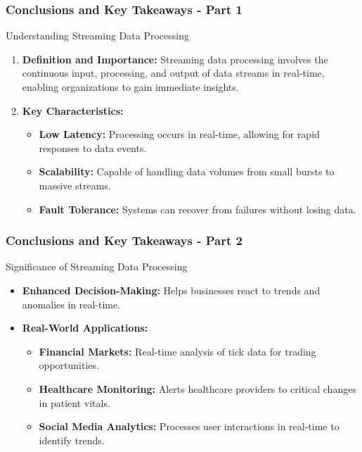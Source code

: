 \documentclass[aspectratio=169]{beamer}
\begin{document}
\begin{frame}[fragile]
    \frametitle{Conclusions and Key Takeaways - Part 1}
    \begin{block}{Understanding Streaming Data Processing}
        \begin{enumerate}
            \item \textbf{Definition and Importance:} 
                Streaming data processing involves the continuous input, processing, and output of data streams in real-time, enabling organizations to gain immediate insights.
            \item \textbf{Key Characteristics:}
                \begin{itemize}
                    \item \textbf{Low Latency:} Processing occurs in real-time, allowing for rapid responses to data events.
                    \item \textbf{Scalability:} Capable of handling data volumes from small bursts to massive streams.
                    \item \textbf{Fault Tolerance:} Systems can recover from failures without losing data.
                \end{itemize}
        \end{enumerate}
    \end{block}
\end{frame}

\begin{frame}[fragile]
    \frametitle{Conclusions and Key Takeaways - Part 2}
    \begin{block}{Significance of Streaming Data Processing}
        \begin{itemize}
            \item \textbf{Enhanced Decision-Making:} Helps businesses react to trends and anomalies in real-time. 
            \item \textbf{Real-World Applications:}
                \begin{itemize}
                    \item \textbf{Financial Markets:} Real-time analysis of tick data for trading opportunities.
                    \item \textbf{Healthcare Monitoring:} Alerts healthcare providers to critical changes in patient vitals.
                    \item \textbf{Social Media Analytics:} Processes user interactions in real-time to identify trends.
                \end{itemize}
        \end{itemize}
    \end{block}
\end{frame}
\end{document}
